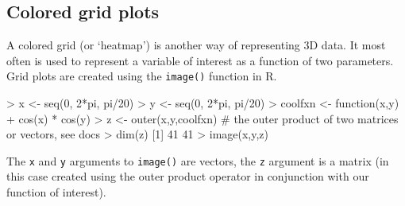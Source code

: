 \subsection{Colored grid plots}

A colored grid (or `heatmap') is another way of representing 3D data. It
most often is used to represent a variable of interest as a function of
two parameters. Grid plots are created using the \lstinline!image()!
function in R.

\begin{R}
> x <- seq(0, 2*pi, pi/20)
> y <- seq(0, 2*pi, pi/20)
> coolfxn <- function(x,y){
+    cos(x) * cos(y)}
> z <- outer(x,y,coolfxn) # the outer product of two matrices or vectors, see docs
> dim(z)
[1] 41 41
> image(x,y,z)
\end{R}
The \lstinline!x! and \lstinline!y! arguments to \lstinline!image()! are
vectors, the \lstinline!z! argument is a matrix (in this case created
using the outer product operator in conjunction with our function of
interest).
